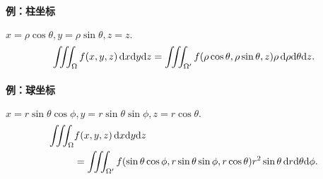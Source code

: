 \paragraph{例：柱坐标}$x=\rho\cos\theta,y=\rho\sin\theta,z=z.$
\[
	\iiint_\Omega f(x,y,z)\mathop{}\!\mathrm{d} x\mathrm{d} y\mathrm{d} z=\iiint_{\Omega'}f(\rho\cos\theta,\rho\sin\theta,z)\rho\mathop{}\!\mathrm{d}\rho\mathrm{d}\theta\mathrm{d} z.
\]
\paragraph{例：球坐标}$x=r\sin\theta\cos\phi,y=r\sin\theta\sin\phi,z=r\cos\theta.$
\begin{align*}
	\iiint_\Omega & f(x,y,z)\mathop{}\!\mathrm{d} x\mathrm{d} y\mathrm{d} z                                                                                   \\
				  & =\iiint_{\Omega'}f(\sin\theta\cos\phi,r\sin\theta\sin\phi,r\cos\theta)r^2\sin\theta\mathop{}\!\mathrm{d} r\mathrm{d}\theta\mathrm{d}\phi.
\end{align*}
